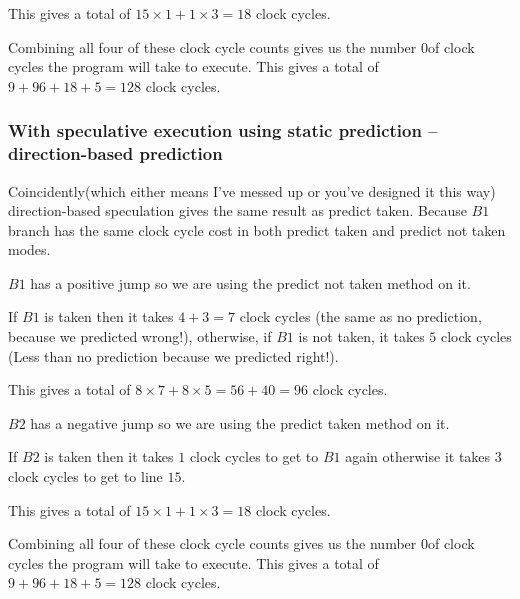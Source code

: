 \documentclass[12pt]{article}
\begin{document}
				This gives a total of $15\times1 + 1\times3 = 18$ clock cycles.
				
				
				Combining all four of these clock cycle counts gives us the number 0of clock cycles the program will take to execute.
				This gives a total of $9 + 96 + 18 + 5 = 128$ clock cycles.
				
			\subsubsection{With speculative execution using static prediction – direction-based prediction}

				Coincidently(which either means I've messed up or you've designed it this way) direction-based speculation gives the same result as predict taken. Because $B1$ branch has the same clock cycle cost in both predict taken and predict not taken modes.
				
				$B1$ has a positive jump so we are using the predict not taken method on it.
				
				If $B1$ is taken then it takes $4 + 3 = 7$ clock cycles (the same as no prediction, because we predicted wrong!), otherwise, if $B1$ is not taken, it takes $5$ clock cycles (Less than no prediction because we predicted right!).
				
				This gives a total of $ 8\times7 + 8\times5 = 56 + 40 = 96$ clock cycles.
				
				$B2$ has a negative jump so we are using the predict taken method on it.
				
				If $B2$ is taken then it takes $1$ clock cycles to get to $B1$ again otherwise it takes $3$ clock cycles to get to line $15$.
			
				This gives a total of $15\times1 + 1\times3 = 18$ clock cycles.
				
				
				Combining all four of these clock cycle counts gives us the number 0of clock cycles the program will take to execute.
				This gives a total of $9 + 96 + 18 + 5 = 128$ clock cycles.
				



\end{document}
